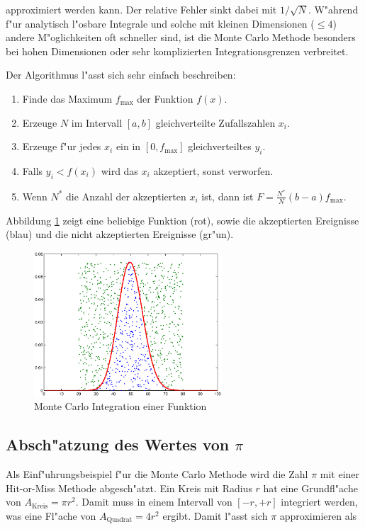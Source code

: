 \begin{refsection}
approximiert werden kann. Der relative Fehler sinkt dabei mit $1 /
\sqrt{N}$. W"ahrend f"ur analytisch l"osbare Integrale und solche mit
kleinen Dimensionen ($\leq 4$) andere M"oglichkeiten oft schneller sind,
ist die Monte Carlo Methode besonders bei hohen Dimensionen oder sehr
komplizierten Integrationsgrenzen verbreitet.

Der Algorithmus l"asst sich sehr einfach beschreiben:

\begin{enumerate}
\item Finde das Maximum $f_{\max}$ der Funktion $f(x)$.
\item Erzeuge $N$ im Intervall $[a,b]$ gleichverteilte Zufallszahlen $x_i$.
\item Erzeuge f"ur jedes $x_i$ ein in $[0,f_{\max}]$ gleichverteiltes $y_i$.
\item Falls $y_i < f(x_i)$ wird das $x_i$ akzeptiert, sonst verworfen.
\item Wenn $N^*$ die Anzahl der akzeptierten $x_i$ ist, dann ist $F =
\frac{N^*}{N}(b-a)f_{\max}$.
\end{enumerate}

Abbildung \ref{fig:integration_histogram} zeigt eine beliebige Funktion
(rot), sowie die akzeptierten Ereignisse (blau) und die nicht akzeptierten
Ereignisse (gr"un).

\begin{figure}[htbp]
	\centering
	\includegraphics[width=7cm]{montecarlo/images/integration_poisson.eps}
	\caption{Monte Carlo Integration einer Funktion}
	\label{fig:integration_histogram}
\end{figure}

\subsection{Absch"atzung des Wertes von $\pi$}
Als Einf"uhrungsbeispiel f"ur die Monte Carlo Methode wird die Zahl $\pi$
mit einer Hit-or-Miss Methode abgesch"atzt. Ein Kreis mit Radius $r$
hat eine Grundfl"ache von $A_{\text{Kreis}} = \pi r^{2}$.  Damit muss
in einem Intervall von $[-r,+r]$ integriert werden, was eine Fl"ache
von $A_{\text{Quadrat}} = 4r^2$ ergibt. Damit l"asst sich $\pi$
approximieren als


\end{refsection}
